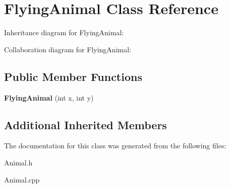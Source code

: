 \hypertarget{classFlyingAnimal}{}\section{Flying\+Animal Class Reference}
\label{classFlyingAnimal}


Inheritance diagram for Flying\+Animal\+:


Collaboration diagram for Flying\+Animal\+:
\subsection*{Public Member Functions}
\begin{DoxyCompactItemize}
\item 
{\bfseries Flying\+Animal} (int x, int y)\hypertarget{classFlyingAnimal_a33fd442c27cb6f96404d274a69b44a9c}{}\label{classFlyingAnimal_a33fd442c27cb6f96404d274a69b44a9c}

\end{DoxyCompactItemize}
\subsection*{Additional Inherited Members}


The documentation for this class was generated from the following files\+:\begin{DoxyCompactItemize}
\item 
Animal.\+h\item 
Animal.\+cpp\end{DoxyCompactItemize}

